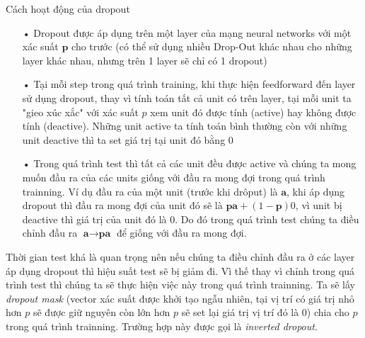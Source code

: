 \begin{enumerate}
Cách hoạt động của dropout
\begin{itemize}
\item[•] Dropout được áp dụng trên một layer của mạng neural networks với một xác suất $\textbf{p}$ cho trước (có thể sử dụng nhiều Drop-Out khác nhau cho những layer khác nhau, nhưng trên 1 layer sẽ chỉ có 1 dropout)
\item[•] Tại mỗi step trong quá trình training, khi thực hiện feedforward đến layer sử dụng dropout, thay vì tính toán tất cả unit có trên layer, tại mỗi unit ta "gieo xúc xắc" với xác suất $p$ xem unit đó được tính (active) hay không được tính (deactive). Những unit active ta tính toán bình thường còn với những unit deactive thì ta set giá trị tại unit đó bằng 0
\item[•] Trong quá trình test thì tất cả các unit đều được active và chúng ta mong muốn đầu ra của các units giống với đầu ra mong đợi trong quá trình trainning. Ví dụ đầu ra của một unit (trước khi drôput) là $\textbf{a}$, khi áp dụng dropout thì đầu ra mong đợi của unit đó sẽ là $\textbf{p}\textbf{a} + (1-\textbf{p})0$, vì unit bị deactive thì giá trị của unit đó là 0. Do đó trong quá trình test chúng ta điều chỉnh đầu ra $\textbf{a} \to \textbf{p}\textbf{a}$ để  giống với đầu ra mong đợi.
\end{itemize} 
Thời gian test khá là quan trọng nên nếu chúng ta điều chỉnh đầu ra ở các layer áp dụng dropout thì hiệu suất test sẽ bị giảm đi. Vì thế thay vì chỉnh trong quá trình test thì chúng ta sẽ thực hiện việc này trong quá trình trainning. Ta sẽ lấy \textit{dropout mask} (vector xác suất được khởi tạo ngẫu nhiên, tại vị trí có giá trị nhỏ hơn $p$ sẽ được giữ nguyên còn lớn hơn $p$ sẽ set lại giá trị vị trí đó là 0) chia cho $p$ trong quá trình trainning. Trường hợp này được gọi là \textit{inverted dropout}.
\end{enumerate}

